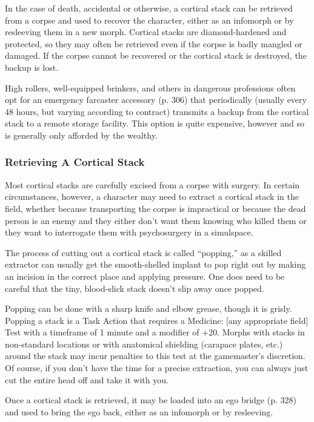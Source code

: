 In the case of death, accidental or otherwise, a cortical stack can be retrieved from a corpse and used to recover the character, either as an infomorph or by resleeving them in a new morph. Cortical stacks are diamond-hardened and protected, so they may often be retrieved even if the corpse is badly mangled or damaged. If the corpse cannot be recovered or the cortical stack is destroyed, the backup is lost. 

High rollers, well-equipped brinkers, and others in dangerous professions often opt for an emergency farcaster accessory (p. 306) that periodically (usually every 48 hours, but varying according to contract) transmits a backup from the cortical stack to a remote storage facility. This option is quite expensive, however and so is generally only afforded by the wealthy. 

\subsubsection{Retrieving A Cortical Stack} 

Most cortical stacks are carefully excised from a corpse with surgery. In certain circumstances, however, a character may need to extract a cortical stack in the field, whether because transporting the corpse is impractical or because the dead person is an enemy and they either don't want them knowing who killed them or they want to interrogate them with psychosurgery in a simulspace. 

The process of cutting out a cortical stack is called ``popping,'' as a skilled extractor can usually get the smooth-shelled implant to pop right out by making an incision in the correct place and applying pressure. One does need to be careful that the tiny, blood-slick stack doesn't slip away once popped. 

Popping can be done with a sharp knife and elbow grease, though it is grisly. Popping a stack is a Task Action that requires a Medicine: [any appropriate field] Test with a timeframe of 1 minute and a modifier of +20. Morphs with stacks in non-standard locations or with anatomical shielding (carapace plates, etc.) around the stack may incur penalties to this test at the gamemaster's discretion. Of course, if you don't have the time for a precise extraction, you can always just cut the entire head off and take it with you. 

Once a cortical stack is retrieved, it may be loaded into an ego bridge (p. 328) and used to bring the ego back, either as an infomorph or by resleeving. 

